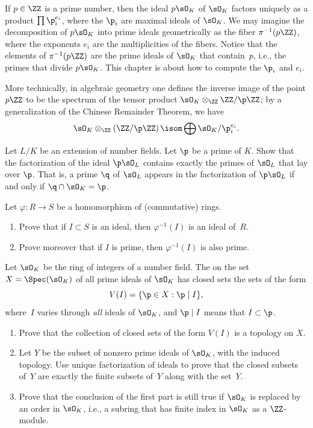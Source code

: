 If $p\in\ZZ$ is a prime number, then the ideal $p\sO_K$ of $\sO_K$
factors uniquely as a product $\prod \p_i^{e_i}$, where the $\p_i$ are
maximal ideals of $\sO_K$.  We may imagine the decomposition of $p\sO_K$
into prime ideals geometrically as the fiber $\pi^{-1}(p\ZZ)$, where
the exponents $e_i$ are the multiplicities of the fibers.  Notice that
the elements of $\pi^{-1}(p\ZZ)$ are the prime ideals of $\sO_K$ that
contain~$p$, i.e., the primes that divide $p\sO_K$.
This chapter is about how to compute the $\p_i$ and $e_i$.

\begin{remark}
  More technically, in algebraic geometry one defines the inverse
  image of the point $p\ZZ$ to be the spectrum of the tensor product
  $\sO_K \otimes_{\ZZ} \ZZ/\p\ZZ$; by a generalization of the Chinese
  Remainder Theorem, we have
  $$
    \sO_K \otimes_{\ZZ} \left(\ZZ/\p\ZZ\right) \isom \bigoplus \sO_K/\p_i^{e_i}.
  $$
\end{remark}

\begin{exercise}
  Let $L/K$ be an extension of number fields. Let $\p$ be a prime of $K$.
  Show that the factorization of the ideal $\p\sO_L$ contains exactly the primes
  of $\sO_L$ that lay over $\p$. That is, a prime $\q$ of $\sO_L$ appears in
  the factorization of $\p\sO_L$ if and only if $\q \cap \sO_K = \p$.
\end{exercise}

\begin{exercise}
  Let $\varphi: R \to S$ be a homomorphism of (commutative) rings.
  \begin{enumerate}
    \item Prove that if $I \subset S$ is an ideal, then $\varphi^{-1}(I)$
    is an ideal of~$R$.
    \item Prove moreover that if $I$ is prime, then $\varphi^{-1}(I)$ is
    also prime.
  \end{enumerate}
\end{exercise}

\begin{exercise}
  Let $\sO_K$ be the ring of integers of a number field.
  The  on the set $X=\Spec(\sO_K)$ of all prime ideals
  of $\sO_K$ has closed sets the sets of the form
  $$
    V(I) = \{ \p\in X : \p \mid I\},
  $$
  where~$I$ varies through {\em all} ideals of $\sO_K$, and $\p\mid I$ means
  that $I \subset \p$.
  \begin{enumerate}
    \item\label{exercise:zariski-part-1} Prove that the collection of closed
    sets of the form $V(I)$ is a topology on $X$.
    \item Let $Y$ be the subset of nonzero prime ideals of $\sO_K$, with the
    induced topology. Use unique factorization of ideals to prove that the
    closed subsets of~$Y$ are exactly the finite subsets of~$Y$ along with
    the set~$Y$.
    \item Prove that the conclusion of the first part is still true
    if $\sO_K$ is replaced by an order in $\sO_K$, i.e., a subring that
    has finite index in $\sO_K$ as a $\ZZ$-module.
  \end{enumerate}
\end{exercise}

